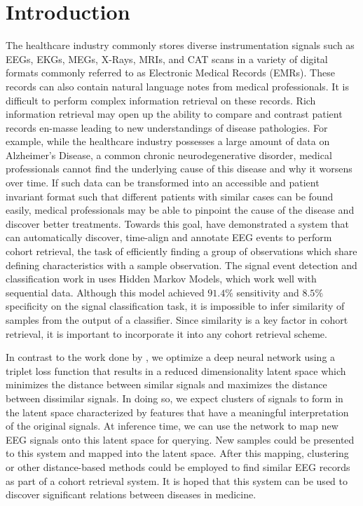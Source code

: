 \chapter{Introduction}
\vspace{-1cm}

The healthcare industry commonly stores diverse instrumentation signals such as EEGs, EKGs, MEGs, X-Rays, MRIs, and CAT scans in a variety of digital formats commonly referred to as Electronic Medical Records (EMRs).  These records can also contain natural language notes from medical professionals. It is difficult to perform complex information retrieval on these records. Rich information retrieval may open up the ability to compare and contrast patient records en-masse leading to new understandings of disease pathologies. For example, while the healthcare industry possesses a large amount of data on Alzheimer's Disease, a common chronic neurodegenerative disorder, medical professionals cannot find the underlying cause of this disease and why it worsens over time. If such data can be transformed into an accessible and patient invariant format such that different patients with similar cases can be found easily, medical professionals may be able to pinpoint the cause of the disease and discover better treatments. Towards this goal, \citet{piccone} have demonstrated a system that can automatically discover, time-align and annotate EEG events to perform cohort retrieval, the task of efficiently finding a group of observations which share defining characteristics with a sample observation. The signal event detection and classification work in \citet{piccone} uses Hidden Markov Models, which work well with sequential data. Although this model achieved $91.4\%$ sensitivity and $8.5\%$ specificity on the signal classification task, it is impossible to infer similarity of samples from the output of a classifier. Since similarity is a key factor in cohort retrieval, it is important to incorporate it into any cohort retrieval scheme.

In contrast to the work done by \citet{piccone}, we optimize a deep neural network using a triplet loss function that results in a reduced dimensionality latent space which minimizes the distance between similar signals and maximizes the distance between dissimilar signals. In doing so, we expect clusters of signals to form in the latent space characterized by features that have a meaningful interpretation of the original signals. At inference time, we can use the network to map new EEG signals onto this latent space for querying. New samples could be presented to this system and mapped into the latent space. After this mapping, clustering or other distance-based methods could be employed to find similar EEG records as part of a cohort retrieval system. It is hoped that this system can be used to discover significant relations between diseases in medicine.  

